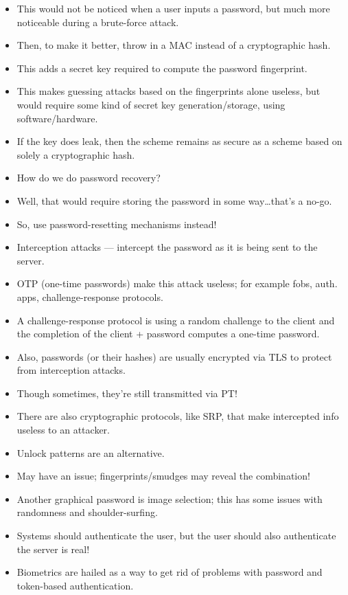 \documentclass{article}
\begin{document}
\begin{itemize}
    \item This would not be noticed when a user inputs a password, but much more noticeable during a brute-force attack.
    \item Then, to make it better, throw in a MAC instead of a cryptographic hash.
    \item This adds a secret key required to compute the password fingerprint.
    \item This makes guessing attacks based on the fingerprints alone useless, but would require some kind of secret key generation/storage, using software/hardware.
    \item If the key does leak, then the scheme remains as secure as a scheme based on solely a cryptographic hash.
    \item How do we do password recovery?
    \item Well, that would require storing the password in some way\dots that's a no-go.
    \item So, use password-resetting mechanisms instead!
    \item Interception attacks --- intercept the password as it is being sent to the server.
    \item OTP (one-time passwords) make this attack useless; for example fobs, auth. apps, challenge-response protocols.
    \item A challenge-response protocol is using a random challenge to the client and the completion of the client + password computes a one-time password.
    \item Also, passwords (or their hashes) are usually encrypted via TLS to protect from interception attacks.
    \item Though sometimes, they're still transmitted via PT!
    \item There are also cryptographic protocols, like SRP, that make intercepted info useless to an attacker.
    \item Unlock patterns are an alternative.
    \item May have an issue; fingerprints/smudges may reveal the combination!
    \item Another graphical password is image selection; this has some issues with randomness and shoulder-surfing.
    \item Systems should authenticate the user, but the user should also authenticate the server is real!
    \item Biometrics are hailed as a way to get rid of problems with password and token-based authentication.

\end{itemize}
\end{document}
